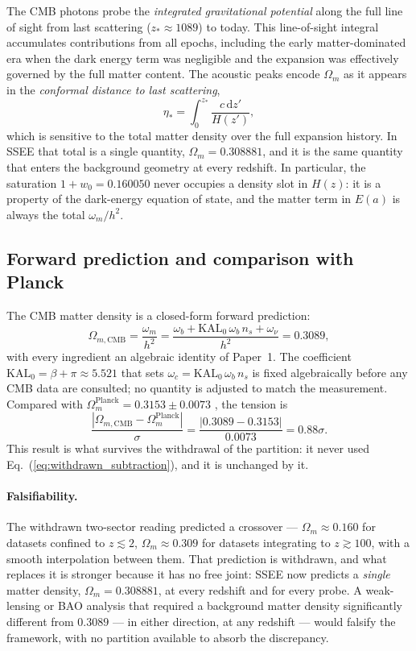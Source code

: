 \documentclass[12pt,a4paper]{article}
\begin{document}
The CMB photons probe the \emph{integrated gravitational potential}
along the full line of sight from last scattering ($z_*\approx1089$) to today.
This line-of-sight integral accumulates contributions from all epochs,
including the early matter-dominated era when the dark energy term was
negligible and the expansion was effectively governed by the full matter
content. The acoustic peaks encode $\Omega_m$ as it appears in the
\emph{conformal distance to last scattering},
\begin{equation}
  \eta_* = \int_0^{z_*} \frac{c\,\mathrm{d}z'}{H(z')},
\end{equation}
which is sensitive to the total matter density over the full expansion
history. In SSEE that total is a single quantity, $\Omega_m=0.308881$,
and it is the same quantity that enters the background geometry at every
redshift. In particular, the saturation $1+w_0=0.160050$ never occupies a density
slot in $H(z)$: it is a property of the dark-energy equation of state, and the
matter term in $E(a)$ is always the total $\omega_m/h^2$.

\subsection{Forward prediction and comparison with Planck}

The CMB matter density is a closed-form forward prediction:
\begin{equation}
  \Omega_{m,\mathrm{CMB}} = \frac{\omega_m}{h^2}
    = \frac{\omega_b + \mathrm{KAL}_0\,\omega_b\,n_s + \omega_\nu}{h^2}
    = 0.3089,
  \label{eq:om_cmb_algebraic}
\end{equation}
with every ingredient an algebraic identity of Paper~1. The coefficient
$\mathrm{KAL}_0=\beta+\pi\approx5.521$ that sets
$\omega_c=\mathrm{KAL}_0\,\omega_b\,n_s$ is fixed algebraically before any CMB
data are consulted; no quantity is adjusted to match the measurement.
Compared with $\Omega_m^{\mathrm{Planck}}=0.3153\pm0.0073$
\citep{Planck2018}, the tension is
\begin{equation}
\frac{|\Omega_{m,\mathrm{CMB}} - \Omega_m^{\mathrm{Planck}}|}{\sigma}
= \frac{|0.3089-0.3153|}{0.0073} = 0.88\sigma .
\end{equation}
This result is what survives the withdrawal of the partition: it never used
Eq.~(\ref{eq:withdrawn_subtraction}), and it is unchanged by it.

\paragraph{Falsifiability.}
The withdrawn two-sector reading predicted a crossover --- $\Omega_m\approx0.160$
for datasets confined to $z\lesssim2$, $\Omega_m\approx0.309$ for datasets
integrating to $z\gtrsim100$, with a smooth interpolation between them. That
prediction is withdrawn, and what replaces it is stronger because it has no
free joint: SSEE now predicts a \emph{single} matter density,
$\Omega_m=0.308881$, at every redshift and for every probe. A weak-lensing or
BAO analysis that required a background matter density significantly different
from $0.3089$ --- in either direction, at any redshift --- would falsify the
framework, with no partition available to absorb the discrepancy.
\end{document}
